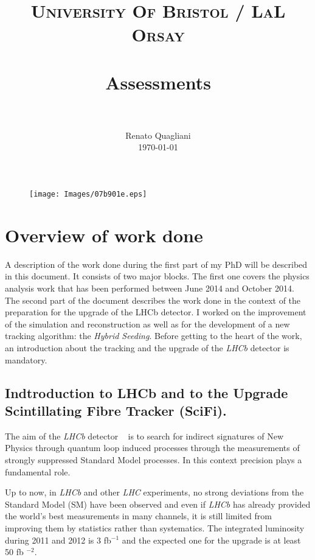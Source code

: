 \documentclass[paper=a4, fontsize=10pt]{scrartcl}
\title{
		\usefont{OT1}{bch}{b}{n}
		\normalfont \normalsize \textsc{University Of Bristol / LaL Orsay} \\ [25pt]
		\horrule{0.5pt} \\[0.4cm]
		\huge Assessments \\
		\horrule{2pt} \\[0.5cm]
}
\author{
		\normalfont 								\normalsize
        Renato Quagliani\\[-3pt]		\normalsize
        \today
}
\date{}
\numberwithin{equation}{section}		%
\numberwithin{figure}{section}			%
\numberwithin{table}{section}				%
\begin{document}
\maketitle
\begin{figure}
\begin{center}
\texttt{[image: Images/07b901e.eps]}
\end{center}
\end{figure}
\section{Overview of work done}
A description of the work done during the first part of my PhD will be described in this document. It consists of two major blocks. The first one covers the physics analysis work that has been performed between June 2014 and October 2014. The second part of the document describes the work done in the context of the preparation for the upgrade of the LHCb detector. I worked on the improvement of the simulation and reconstruction as well as for the development of a new tracking algorithm: the \textit{Hybrid Seeding}.
Before getting to the heart of the work, an introduction about the tracking and the upgrade of the \textit{LHCb} detector is mandatory.
\subsection{Indtroduction to LHCb and to the Upgrade Scintillating Fibre Tracker (SciFi).}
The aim of the \textit{LHCb} detector ~\cite{Blake1} is to search for indirect signatures of New Physics through quantum loop induced processes through the measurements of strongly suppressed Standard Model processes.
In this context precision plays a fundamental role. 

Up to now, in \textit{LHCb} and other \textit{LHC} experiments, no strong deviations from the Standard Model (SM) have been observed and even if \textit{LHCb} has already provided the world's best measurements in many channels, it is still limited from improving them by statistics rather than systematics.
The integrated luminosity during 2011 and 2012 is 3 fb$^{-1}$ and the expected one for the upgrade is at least 50 fb $^{-2}$.
\end{document}
